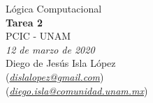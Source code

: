 \documentclass[letterpaper,12pt]{article}
\theoremstyle{definition}
\begin{document}
\begin{center}
  {\large Lógica Computacional}\\
  \vspace{0.2cm}
  {\large\bfseries Tarea 2}\\
  \vspace{0.2cm}
  {\large PCIC - UNAM}\\
  \vspace{0.5cm}
  {\itshape 12 de marzo de 2020}\\
  \vspace{0.5cm}
  Diego de Jesús Isla López\\
  (\href{mailto:dislalopez@gmail.com}{\itshape dislalopez@gmail.com})\\
  (\href{mailto:diego.isla@comunidad.unam.mx}{\itshape diego.isla@comunidad.unam.mx})\\
\end{center}




\end{document}
